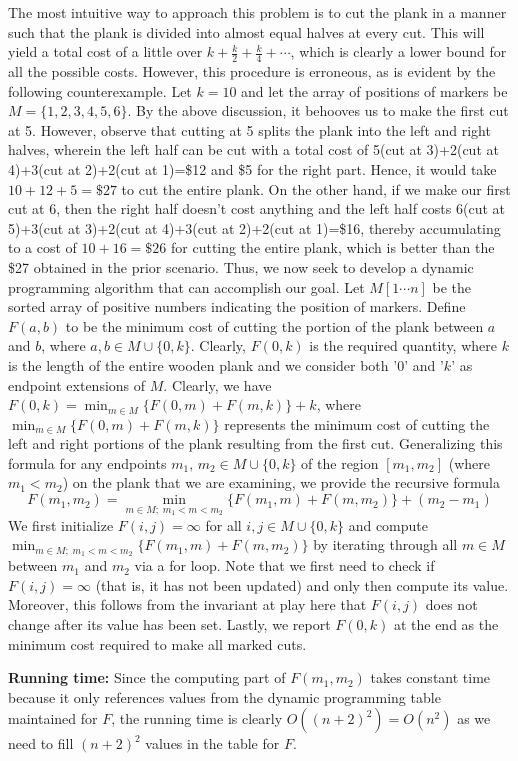 \documentclass[tikz, letterpaper,12pt]{article}
\begin{document}
The most intuitive way to approach this problem is to cut the plank in a manner such that the plank is divided into almost equal halves at every cut. This will yield a total cost of a little over $k+\frac{k}{2}+\frac{k}{4}+\cdots$, which is clearly a lower bound for all the possible costs. However, this procedure is erroneous, as is evident by the following counterexample. Let $k=10$ and let the array of positions of markers be $M=\{1,2,3,4,5,6\}$. By the above discussion, it behooves us to make the first cut at 5. However, observe that cutting at 5 splits the plank into the left and right halves, wherein the left half can be cut with a total cost of 5(cut at 3)+2(cut at 4)+3(cut at 2)+2(cut at 1)=\$12 and \$5 for the right part. Hence, it would take $10+12+5=\$27$ to cut the entire plank. On the other hand, if we make our first cut  at 6, then the right half doesn't cost anything and the left half costs 6(cut at 5)+3(cut at 3)+2(cut at 4)+3(cut at 2)+2(cut at 1)=\$16, thereby accumulating to a cost of $10+16=\$26$ for cutting the entire plank, which is better than the \$27 obtained in the prior scenario. Thus, we now seek to develop a dynamic programming algorithm that can accomplish our goal. Let $M[1\cdots n]$ be the sorted array of positive numbers indicating the position of markers. Define $F(a,b)$ to be the minimum cost of cutting the portion of the plank between $a$ and $b$, where $a,b\in M\cup\{0,k\}$. Clearly, $F(0,k)$ is the required quantity, where $k$ is the length of the entire wooden plank and we consider both '$0$' and '$k$' as endpoint extensions of $M$. Clearly, we have $F(0,k)=\min_{m\in M}\{F(0,m)+F(m,k)\}+k$, where $\min_{m\in M}\{F(0,m)+F(m,k)\}$ represents the minimum cost of cutting the left and right portions of the plank resulting from the first cut. Generalizing this formula for any endpoints $m_1,\,m_2\in M\cup\{0,k\}$ of the region $[m_1,m_2]$ (where $m_1<m_2$) on the plank that we are examining, we provide the recursive formula
\begin{equation*}
    F(m_1,m_2)=\min_{m\in M;\;m_1<m<m_2}\{F(m_1,m)+F(m,m_2)\}+(m_2-m_1)
\end{equation*}
We first initialize $F(i,j)=\infty$ for all $i,j\in M\cup\{0,k\}$ and compute $\min_{m\in M;\;m_1<m<m_2}\{F(m_1,m)+F(m,m_2)\}$ by iterating through all $m\in M$ between $m_1$ and $m_2$ via a for loop. Note that we first need to check if $F(i,j)=\infty$ (that is, it has not been updated) and only then compute its value. Moreover, this follows from the invariant at play here that $F(i,j)$ does not change after its value has been set. Lastly, we report $F(0,k)$ at the end as the minimum cost required to make all marked cuts.

\textbf{Running time:} Since the computing part of $F(m_1,m_2)$ takes constant time because it only references values from the dynamic programming table maintained for $F$, the running time is clearly $O\left((n+2)^2\right)=O(n^2)$ as we need to fill $(n+2)^2$ values in the table for $F$.
\end{document}
